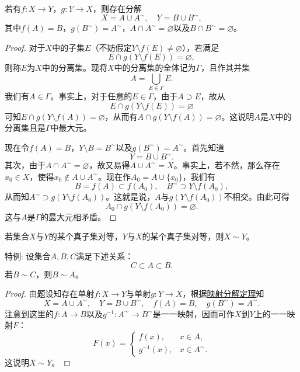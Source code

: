 \documentclass[lang=cn,newtx,10pt,scheme=chinese]{../Template/elegantbook}
\begin{document}
\begin{lemma}[映射分解定理]\label{lemma:映射分解定理}
若有\(f:X\rightarrow Y\)，\(g:Y\rightarrow X\)，则存在分解
\[X = A\cup A^{\sim}, \quad Y = B\cup B^{\sim},\]
其中\(f(A)=B\)，\(g(B^{\sim})=A^{\sim}\)，\(A\cap A^{\sim}=\varnothing\)以及\(B\cap B^{\sim}=\varnothing\)。
\end{lemma}
\begin{proof}
  对于\(X\)中的子集\(E\)（不妨假定\(Y\setminus f(E)\neq\varnothing\)），若满足
\[E\cap g(Y\setminus f(E)) = \varnothing,\]
则称\(E\)为\(X\)中的分离集。现将\(X\)中的分离集的全体记为\(\Gamma\)，且作其并集
\[A = \bigcup_{E\in\Gamma}E.\]
我们有\(A\in\Gamma\)。事实上，对于任意的\(E\in\Gamma\)，由于\(A\supset E\)，故从
\[E\cap g(Y\setminus f(E)) = \varnothing\]
可知\(E\cap g(Y\setminus f(A)) = \varnothing\)，从而有\(A\cap g(Y\setminus f(A)) = \varnothing\)。这说明\(A\)是\(X\)中的分离集且是\(\Gamma\)中最大元。

现在令\(f(A)=B\)，\(Y\setminus B = B^{\sim}\)以及\(g(B^{\sim}) = A^{\sim}\)。首先知道
\[Y = B\cup B^{\sim}.\]
其次，由于\(A\cap A^{\sim} = \varnothing\)，故又易得\(A\cup A^{\sim} = X\)。事实上，若不然，那么存在\(x_0\in X\)，使得\(x_0\notin A\cup A^{\sim}\)。现在作\(A_0 = A\cup\{x_0\}\)，我们有
\[B = f(A)\subset f(A_0), \quad B^{\sim}\supset Y\setminus f(A_0),\]
从而知\(A^{\sim}\supset g(Y\setminus f(A_0))\)。这就是说，\(A\)与\(g(Y\setminus f(A_0))\)不相交。由此可得
\[A_0\cap g(Y\setminus f(A_0)) = \varnothing.\]
这与\(A\)是\(\Gamma\)的最大元相矛盾。

\end{proof}

\begin{theorem}\label{theorem:Cantor - Bernstein定理}
若集合\(X\)与\(Y\)的某个真子集对等，\(Y\)与\(X\)的某个真子集对等，则\(X\sim Y\)。
\end{theorem}
\begin{note}
  特例:
设集合\(A,B,C\)满足下述关系：
\[C\subset A\subset B.\]
若\(B\sim C\)，则\(B\sim A\)。
\end{note}
\begin{proof}
  由题设知存在单射\(f:X\rightarrow Y\)与单射\(g:Y\rightarrow X\)，根据\hyperref[lemma:映射分解定理]{映射分解定理}知
\[X = A\cup A^{\sim}, \quad Y = B\cup B^{\sim}, \quad f(A) = B, \quad g(B^{\sim}) = A^{\sim}.\]
注意到这里的\(f:A\rightarrow B\)以及\(g^{-1}:A^{\sim}\rightarrow B^{\sim}\)是一一映射，因而可作\(X\)到\(Y\)上的一一映射\(F\)：
\[F(x)=
\begin{cases}
f(x), & x\in A, \\
g^{-1}(x), & x\in A^{\sim}.
\end{cases}
\]
这说明\(X\sim Y\)。

\end{proof}
\end{document}
